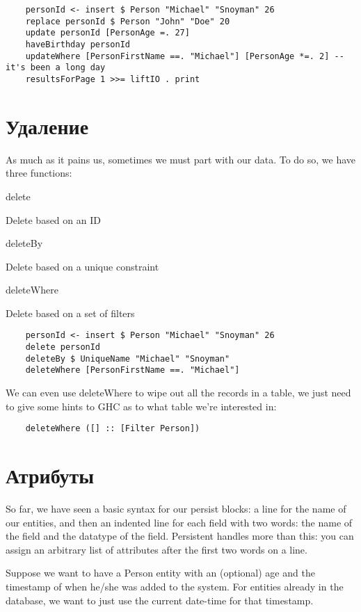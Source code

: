 \begin{lstlisting}
    personId <- insert $ Person "Michael" "Snoyman" 26
    replace personId $ Person "John" "Doe" 20
    update personId [PersonAge =. 27]
    haveBirthday personId
    updateWhere [PersonFirstName ==. "Michael"] [PersonAge *=. 2] -- it's been a long day
    resultsForPage 1 >>= liftIO . print
\end{lstlisting}%

\section{Удаление} %

As much as it pains us, sometimes we must part with our data. To do so, we have three functions:

delete

Delete based on an ID

deleteBy

Delete based on a unique constraint

deleteWhere

Delete based on a set of filters

\begin{lstlisting}
    personId <- insert $ Person "Michael" "Snoyman" 26
    delete personId
    deleteBy $ UniqueName "Michael" "Snoyman"
    deleteWhere [PersonFirstName ==. "Michael"]
\end{lstlisting}%

We can even use deleteWhere to wipe out all the records in a table, we just need to give some hints to GHC as to what table we're interested in:

\begin{lstlisting}
    deleteWhere ([] :: [Filter Person])
\end{lstlisting}

\section{Атрибуты} %

So far, we have seen a basic syntax for our persist blocks: a line for the name of our entities, and then an indented line for each field with two words: the name of the field and the datatype of the field. Persistent handles more than this: you can assign an arbitrary list of attributes after the first two words on a line.

Suppose we want to have a Person entity with an (optional) age and the timestamp of when he/she was added to the system. For entities already in the database, we want to just use the current date-time for that timestamp.

